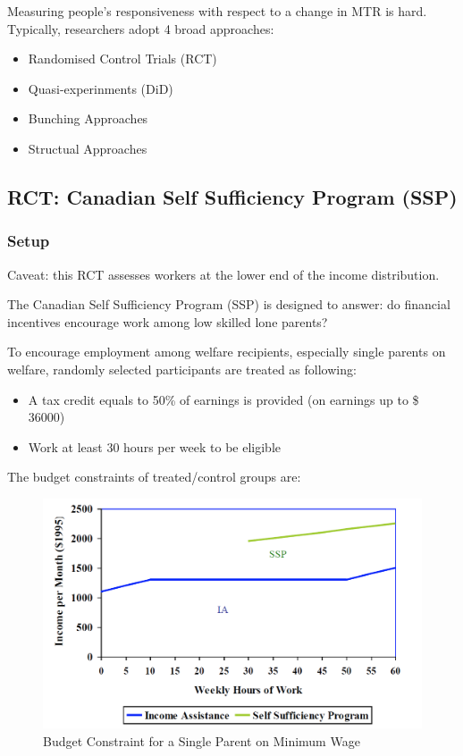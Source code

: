             Measuring people's responsiveness with respect to a change in MTR is hard. Typically, researchers adopt 4 broad approaches:
            \begin{itemize}
                \item Randomised Control Trials (RCT)
                \item Quasi-experinments (DiD)
                \item Bunching Approaches
                \item Structual Approaches
            \end{itemize}

        \subsection{RCT: Canadian Self Sufficiency Program (SSP)}

            \subsubsection{Setup}

                Caveat: this RCT assesses workers at the lower end of the income distribution.

                The Canadian Self Sufficiency Program (SSP) is designed to answer: do financial incentives encourage work among low skilled lone parents?

                To encourage employment among welfare recipients, especially single parents on welfare, randomly selected participants are treated as following:
                \begin{itemize}
                    \item A tax credit equals to 50\% of earnings is provided (on earnings up to \$ 36000)
                    \item Work at least 30 hours per week to be eligible
                \end{itemize}

                The budget constraints of treated/control groups are:
                
                \begin{figure}[H]
                    \centering
                    \includegraphics[width=4.5in]{images/ch13/13_SSP_1.png}
                    \caption{Budget Constraint for a Single Parent on Minimum Wage}
                \end{figure}

